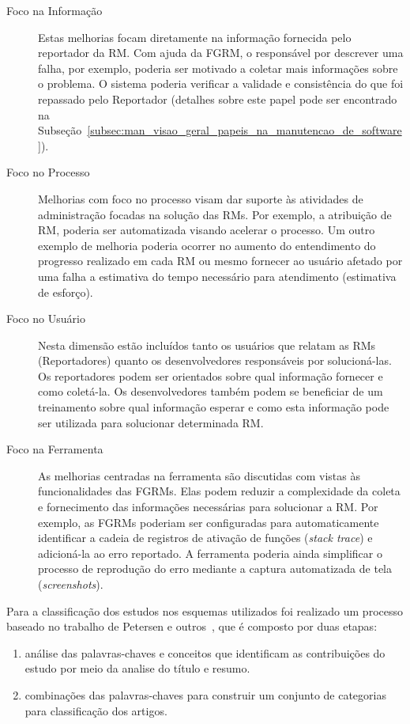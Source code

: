 \begin{description}
	\item[Foco na Informação] Estas melhorias focam diretamente na informação
		fornecida pelo reportador da RM\@. Com ajuda da FGRM, o responsável por
		descrever uma falha, por exemplo, poderia ser motivado a coletar mais
		informações sobre o problema. O sistema poderia verificar a validade e
		consistência do que foi repassado pelo Reportador (detalhes sobre este
		papel pode ser encontrado na
		Subseção~\ref{subsec:man_visao_geral_papeis_na_manutencao_de_software}).
	\item[Foco no Processo] Melhorias com foco no processo visam dar suporte às
		atividades de administração focadas na solução das RMs. Por exemplo, a
        atribuição de RM, poderia ser automatizada visando acelerar o processo.
        Um outro exemplo de melhoria poderia ocorrer no aumento do entendimento
        do progresso realizado em cada RM ou mesmo fornecer ao usuário afetado
        por uma falha a estimativa do tempo necessário para atendimento
        (estimativa de esforço).
	\item[Foco no Usuário] Nesta dimensão estão incluídos tanto os usuários que
		relatam as RMs (Reportadores) quanto os desenvolvedores responsáveis por
        solucioná-las. Os reportadores podem ser orientados sobre qual
        informação fornecer e como coletá-la. Os desenvolvedores também podem se
        beneficiar de um treinamento sobre qual informação esperar e como esta
        informação pode ser utilizada para solucionar determinada RM\@.
	\item[Foco na Ferramenta] As melhorias centradas na ferramenta são
		discutidas com vistas às funcionalidades das FGRMs\@. Elas podem reduzir
		a complexidade da coleta e fornecimento das informações necessárias para
		solucionar a RM\@. Por exemplo, as FGRMs poderiam ser configuradas para
		automaticamente identificar a cadeia de registros de ativação de funções
        (\textit{stack trace}) e adicioná-la ao erro reportado. A ferramenta
        poderia ainda simplificar o processo de reprodução do erro mediante a
        captura automatizada de tela (\textit{screenshots}).
\end{description}

Para a classificação dos estudos nos esquemas utilizados foi realizado um
processo baseado no trabalho de Petersen e outros~\cite{Petersen2008}, que é
composto por duas etapas:

\begin{enumerate}[I]
	\item análise das palavras-chaves e conceitos que
		identificam as contribuições do estudo por meio da analise do título e
		resumo.
	\item combinações das palavras-chaves para construir um conjunto de
		categorias para classificação dos artigos.
\end{enumerate}

